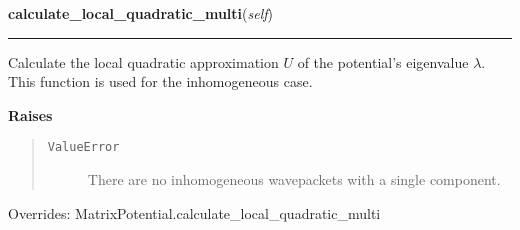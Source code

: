     \vspace{0.5ex}

\hspace{.8\funcindent}\begin{boxedminipage}{\funcwidth}

    \raggedright \textbf{calculate\_local\_quadratic\_multi}(\textit{self})

    \vspace{-1.5ex}

    \rule{\textwidth}{0.5\fboxrule}
\setlength{\parskip}{2ex}
    Calculate the local quadratic approximation $U$ of the potential's
    eigenvalue $\lambda$. This function is used for the
    inhomogeneous case.

\setlength{\parskip}{1ex}
      \textbf{Raises}
    \vspace{-1ex}

      \begin{quote}
        \begin{description}

          \item[\texttt{ValueError}]

          There are no inhomogeneous wavepackets with a single component.

        \end{description}

      \end{quote}

      Overrides: MatrixPotential.calculate\_local\_quadratic\_multi

    \end{boxedminipage}

    \vspace{0.5ex}

